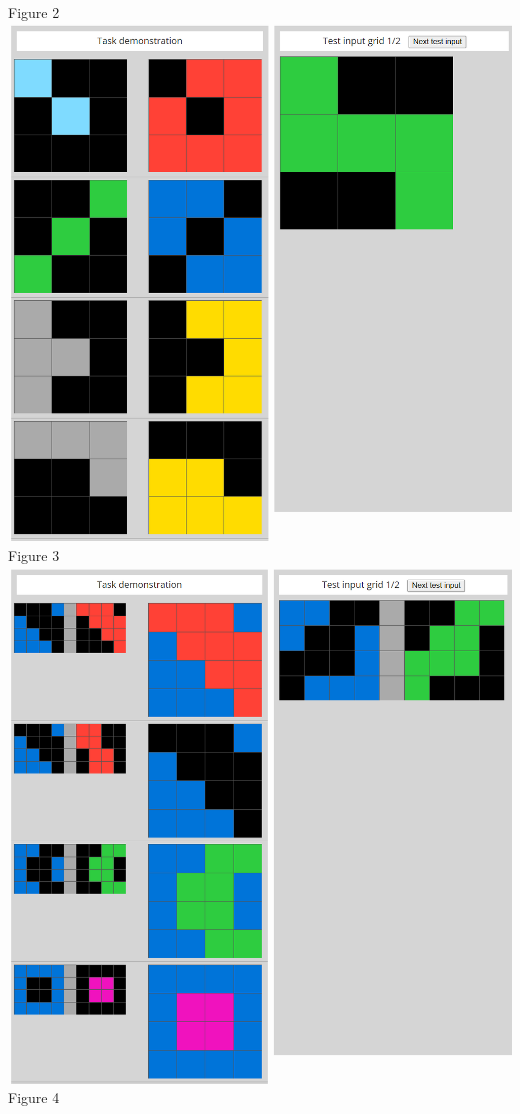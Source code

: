 \documentclass[letterpaper]{article} %
\begin{document}
\begin{center}
    Figure 2\\
    \vspace{\baselineskip}\vspace{\baselineskip}
    \includegraphics[scale = 0.22]{solved_3.png}\\
    Figure 3\\
    \vspace{\baselineskip}\vspace{\baselineskip}
    \includegraphics[scale = 0.22]{solved_4.png}\\
    Figure 4
\end{center}
\end{document}
